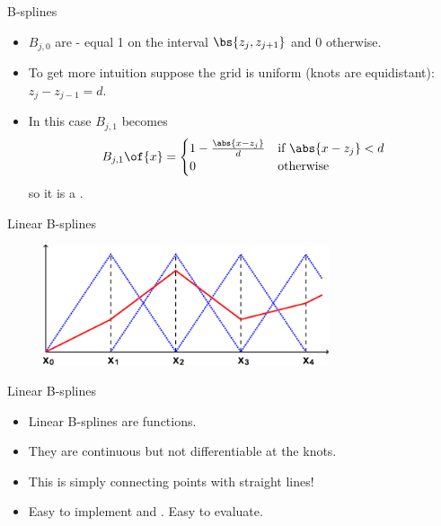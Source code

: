 \documentclass[11pt,xcolor={dvipsnames},aspectratio=159,hyperref={pdftex,pdfpagemode=UseNone,hidelinks,pdfdisplaydoctitle=true},usepdftitle=false]{beamer}
\begin{document}
 \begin{frame}{B-splines}
    \begin{itemize}
        \item $B_{j,0}$ are  - equal 1 on the interval $\bs{z_j,z_{j+1}}$ and 0 otherwise.
        \item To get more intuition suppose the grid is uniform (knots are equidistant): $z_j - z_{j-1}=d$.
        \item In this case $B_{j,1}$ becomes 
        \begin{align*}
            B_{j,1}\of{x}= \begin{cases}
                1-\frac{\abs{x-z_j}}{d} & \text{if } \abs{x-z_j} < d \\
                0 & \text{otherwise}
                \end{cases}
        \end{align*}
        so it is a .
    \end{itemize}
\end{frame}   


    \begin{frame}{Linear B-splines}
    \centering
    \begin{figure}
        \includegraphics[width=0.75\textwidth]{tent.png}
    \end{figure}
    \end{frame}

    \begin{frame}{Linear B-splines}
    \begin{itemize}
    \item Linear B-splines are  functions.
    \item They are continuous but not differentiable at the knots.
    \item This is simply connecting points with straight lines!
    \item Easy to implement and . Easy to evaluate.
\end{itemize}
        \end{frame}    
\end{document}
